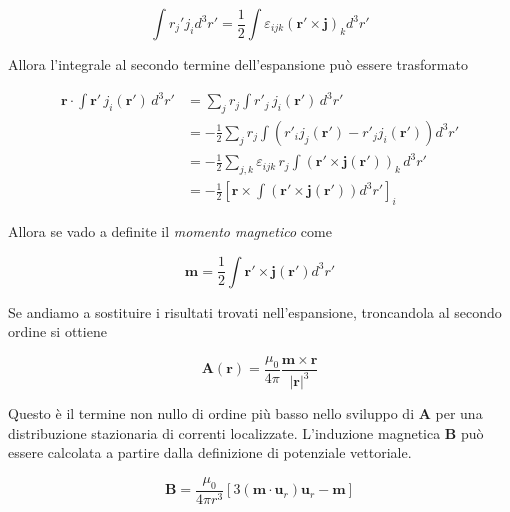 \begin{equation*}
    \int r_j' j_i d^3 r' = \frac{1}{2} \int \varepsilon_{ijk} (\mathbf{r'} \times \mathbf{j})_k d^3 r'
\end{equation*}

Allora l'integrale al secondo termine dell'espansione può essere trasformato 

\begin{align}
\mathbf{r} \cdot \int \mathbf{r'} \, j_i(\mathbf{r'}) \, d^3 r'
&= \sum_j r_j \int r'_j \, j_i(\mathbf{r'}) \, d^3 r' \\[6pt] \label{eq: integrale_momento_magnetico}
&= -\frac{1}{2} \sum_j r_j \int \left( r'_i j_j(\mathbf{r'}) - r'_j j_i(\mathbf{r'}) \right) d^3 r' \\[6pt]
&= -\frac{1}{2} \sum_{j,k} \varepsilon_{ijk} \, r_j \int \left( \mathbf{r'} \times \mathbf{j}(\mathbf{r'}) \right)_k \, d^3 r' \\[6pt]
&= -\frac{1}{2} \left[ \mathbf{r} \times \int \left( \mathbf{r'} \times \mathbf{j}(\mathbf{r'}) \right) d^3 r' \right]_i
\end{align}

Allora se vado a definite il \emph{momento magnetico} come 

\begin{tcolorbox}[colback=yellow!10!white, colframe=orange!70!black, boxrule=0.8pt]
\begin{equation} \label{eq:momento_magnetico}
    \mathbf{m} = \frac{1}{2} \int\mathbf{r'} \times \mathbf{j}(\mathbf{r'}) d^3 r' 
\end{equation}
\end{tcolorbox}

Se andiamo a sostituire i risultati trovati nell'espansione, troncandola al secondo ordine si ottiene 

\begin{equation}
    \mathbf{A} (\mathbf{r}) = \frac{\mu_0}{4 \pi} \frac{\mathbf{m \times \mathbf{r}}}{|\mathbf{r}|^3}
\end{equation}

Questo è il termine non nullo di ordine più basso nello sviluppo di $\mathbf{A}$ per una distribuzione stazionaria di correnti localizzate. L'induzione magnetica $\mathbf{B}$ può essere calcolata a partire dalla definizione di potenziale vettoriale.

\begin{tcolorbox}[colback=yellow!10!white, colframe=orange!70!black, boxrule=0.8pt]
\begin{equation} \label{eq:campo_magnetico_dipolo}
    \mathbf{B = }\frac{\mu_0}{4 \pi r^3} \left[ 3 (\mathbf{m} \cdot \mathbf{u}_r) \mathbf{u}_r - \mathbf{m} \right]
\end{equation}
\end{tcolorbox}

